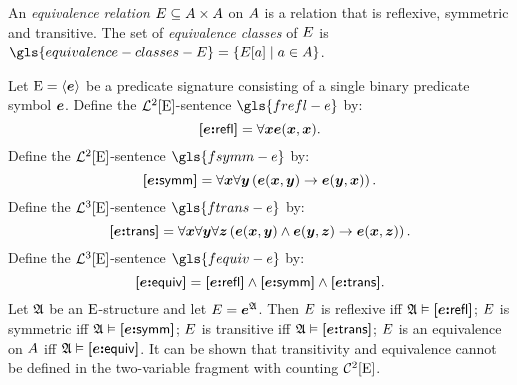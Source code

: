 An \emph{equivalence relation} $\relE \subseteq \domAA$ on $\domA$
is a relation that is reflexive, symmetric and transitive.
The set of \emph{equivalence classes} of $\relE$ is
$\gls{equivalence-classes-E} = \setbd{\relE[\ea]}{\ea \in \domA}$.

Let $\ES = \seq{\se}$ be a predicate signature consisting of a single binary
predicate symbol $\se$.
Define the $\vFoF2\ES$-sentence $\gls{frefl-e}$ by:
\[
  \frefl\se = \forall\xx \se(\xx,\xx).
\]
Define the $\vFoF2\ES$-sentence $\gls{fsymm-e}$ by:
\[
  \fsymm\se = \forall\xx\forall\yy 
  \left(\se(\xx,\yy) \limp \se(\yy,\xx)\right).
\]
Define the $\vFoF3\ES$-sentence $\gls{ftrans-e}$ by:
\[
  \ftrans\se = \forall\xx\forall\yy\forall\zz
  \left(\se(\xx,\yy) \land \se(\yy,\zz) \limp \se(\xx,\zz)\right).
\]
Define the $\vFoF3\ES$-sentence $\gls{fequiv-e}$ by:
\[
  \fequiv\se = \frefl\se \land \fsymm\se \land \ftrans\se.
\]
Let $\StrA$ be an $\ES$-structure and let $\relE = \se^\StrA$.
Then $\relE$ is reflexive iff $\StrA \vDash \frefl\se$;
$\relE$ is symmetric iff $\StrA \vDash \fsymm\se$;
$\relE$ is transitive iff $\StrA \vDash \ftrans\se$;
$\relE$ is an equivalence on $\domA$ iff $\StrA \vDash \fequiv\se$.
It can be shown that transitivity and equivalence cannot be defined in the
two-variable fragment with counting $\vFocF2\ES$.